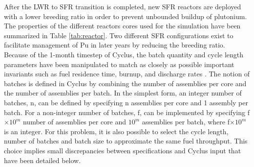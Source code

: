 \documentclass[12pt]{article}
\begin{document}
After the LWR to SFR transition is completed, new SFR reactors are deployed
with a lower breeding ratio in order to prevent unbounded buildup of
plutonium. The properties of the different reactors cores used for the
simulation have been summarized in Table \ref{tab:reactor}. Two different SFR 
configurations exist to facilitate management of Pu in later years by reducing
the breeding ratio.  Because of the 1-month timestep of Cyclus, the batch quantity and cycle length
parameters have been manipulated to match as closely as possible important
invariants such as fuel residence time, burnup, and discharge rates
\cite{B.Feng_calculation}. The notion of batches
is defined in Cyclus by combining the number of assemblies per core and 
the number of assemblies per batch.  In the simplest form, an integer number of
batches, n, can be defined by specifying n assemblies per core and 1 assembly
per batch.  For a non-integer number of batches, f, can be implemented by
specifying f$\times 10^m$ number of assemblies per core and $10^m$ assemblies
per batch, where f$\times 10^m$ is an integer.  For this problem, it is also
possible to select the cycle length, number of batches and batch size to
approximate the same fuel throughput.  This choice implies small 
discrepancies between specifications and Cyclus input that have been detailed 
below.
\end{document}
